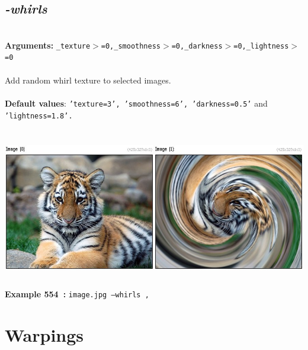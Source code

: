 \documentclass[a4paper,11pt,twoside]{book}
\begin{document}
\subsection{\emph{-whirls} }\vspace*{-0.5em}
~\\\textbf{Arguments: } 
{\small \texttt{\_texture$>$=0,\_smoothness$>$=0,\_darkness$>$=0,\_lightness$>$=0}}\\~\\
Add random whirl texture to selected images.
~\\~\\\textbf{Default values}: {\small \texttt{'texture=3', 'smoothness=6', 'darkness=0.5'} and \texttt{'lightness=1.8'.}}
\begin{center}\includegraphics[keepaspectratio=true,height=7cm,width=\textwidth]{img/gmic_def554.jpg}\\
{\footnotesize \textbf{Example 554~:} \texttt{image.jpg --whirls ,}}
\end{center}
\section{Warpings}
\end{document}
